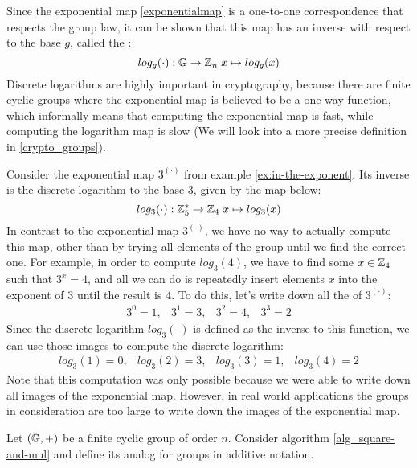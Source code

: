 Since the exponential map \eqref{exponentialmap} is a one-to-one correspondence that respects the group law, it can be shown that this map has an inverse with respect to the base $g$, called the :
\begin{equation}
\label{logarithm_map}
log_g(\cdot): \mathbb{G} \to \mathbb{Z}_n\; x \mapsto log_g(x)
\end{equation}
Discrete logarithms are highly important in cryptography, because there are finite cyclic groups where the exponential map is believed to be a one-way function, which informally means that computing the exponential map is fast, while computing the logarithm map is slow (We will look into a more precise definition in \ref{crypto_groups}).
\begin{example}Consider the exponential map $3^{(\cdot)}$ from example \ref{ex:in-the-exponent}. Its inverse is the discrete logarithm to the base $3$, given by the map below:
$$
log_3(\cdot): \mathbb{Z}_5^* \to \mathbb{Z}_4\; x \mapsto log_3(x)
$$ 
In contrast to the exponential map $3^{(\cdot)}$, we have no way to actually compute this map, other than by trying all elements of the group until we find the correct one. For example, in order to compute $log_3(4)$, we have to find some $x\in \mathbb{Z}_4$ such that $3^x=4$, and all we can do is repeatedly insert elements $x$ into the exponent of $3$ until the result is $4$. To do this, let's write down all the  of $3^{(\cdot)}$: 
$$
\begin{array}{cccc}
3^0 = 1, & 3^1 = 3, & 3^2 = 4, & 3^3 = 2
\end{array}
$$
Since the discrete logarithm $log_3(\cdot)$ is defined as the inverse to this function, we can use those images to compute the discrete logarithm:
$$
\begin{array}{ccccc}
log_3(1) = 0, & log_3(2) = 3, & log_3(3) = 1, & log_3(4) = 2
\end{array}
$$
Note that this computation was only possible because we were able to write down all images of the exponential map. However, in real world applications the groups in consideration are too large to write down the images of the exponential map. 
\end{example}
\begin{exercise}
\label{alg_double-and-add} Let $(\mathbb{G},+)$ be a finite cyclic group of order $n$. Consider algorithm \ref{alg_square-and-mul} and define its analog for groups in additive notation.
\end{exercise}


